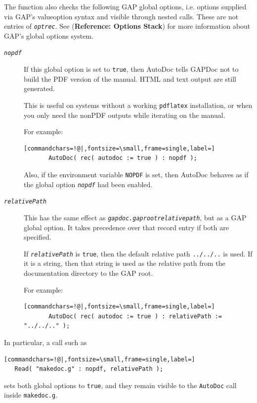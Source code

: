 \documentclass[a4paper,11pt]{report}
\begin{document}
{{{\begin{description}
\begin{description}
\end{description}
 
\end{description}
 

 The function also checks the following GAP global options, i.e. options
supplied via GAP's value\texttt{}option syntax and visible through
nested calls. These are not entries of \mbox{\texttt{\mdseries\slshape optrec}}. See  (\textbf{Reference: Options Stack}) for more information about GAP's global options system. 
\begin{description}
\item[{\mbox{\texttt{\mdseries\slshape nopdf}}}]  If this global option is set to \texttt{true}, then \textsf{AutoDoc} tells \textsf{GAPDoc} not to build the PDF version of the manual. HTML and text output are still
generated. 

 This is useful on systems without a working \texttt{pdflatex} installation, or when you only need the non\texttt{}PDF outputs
while iterating on the manual. 

 For example: 
\begin{Verbatim}[commandchars=!@|,fontsize=\small,frame=single,label=]
       AutoDoc( rec( autodoc := true ) : nopdf );
\end{Verbatim}
 Also, if the environment variable \texttt{NOPDF} is set, then \textsf{AutoDoc} behaves as if the global option \mbox{\texttt{\mdseries\slshape nopdf}} had been enabled. 
\item[{\mbox{\texttt{\mdseries\slshape relativePath}}}]  This has the same effect as \mbox{\texttt{\mdseries\slshape gapdoc.gap{\textunderscore}root{\textunderscore}relative{\textunderscore}path}}, but as a GAP global option. It takes precedence over that record entry if
both are specified. 

 If \mbox{\texttt{\mdseries\slshape relativePath}} is \texttt{true}, then the default relative path \texttt{../../..} is used. If it is a string, then that string is used as the relative path from
the documentation directory to the GAP root. 

 For example: 
\begin{Verbatim}[commandchars=!@|,fontsize=\small,frame=single,label=]
       AutoDoc( rec( autodoc := true ) : relativePath := "../../.." );
\end{Verbatim}
 
\end{description}
 In particular, a call such as 
\begin{Verbatim}[commandchars=!@|,fontsize=\small,frame=single,label=]
   Read( "makedoc.g" : nopdf, relativePath );
\end{Verbatim}
 sets both global options to \texttt{true}, and they remain visible to the \texttt{AutoDoc} call inside \texttt{makedoc.g}. 

}}}
\end{document}
